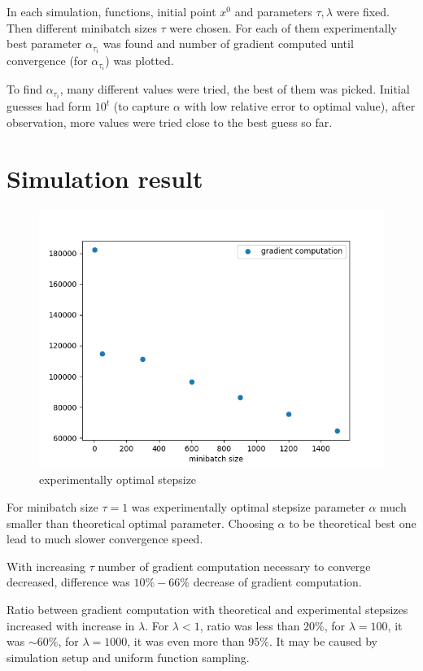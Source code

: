 \documentclass[11pt]{book}
\theoremstyle{definition}
\begin{document}
	
	In each simulation, functions, initial point $x^0$ and parameters $\tau, \lambda$ were fixed. Then different minibatch sizes $\tau$ were chosen. For each of them experimentally best parameter $\alpha_{\tau_i}$ was found and number of gradient computed until convergence (for $\alpha_{\tau_i}$) was plotted. 
	
	To find $\alpha_{\tau_i}$, many different values were tried, the best of them was picked. Initial guesses had form $10^t$ (to capture $\alpha$ with low relative error to optimal value), after observation, more values were tried close to the best guess so far.\\
	
	\section{Simulation result}
	
	\begin{figure}[H]
		\centering
		\includegraphics[width=.7\linewidth]{optimal_stepsize.png}
		\caption{experimentally optimal stepsize}
		\label{fig:optimal stepsize}
	\end{figure}
	
	
	
	For minibatch size $\tau=1$ was experimentally optimal stepsize parameter $\alpha$ much smaller than theoretical optimal parameter. Choosing $\alpha$ to be theoretical best one lead to much slower convergence speed.
	
	With increasing $\tau$ number of gradient computation necessary to converge decreased, difference was $10\% - 66\%$ decrease of gradient computation.
	
	Ratio between gradient computation with theoretical and experimental stepsizes increased with increase in $\lambda$. For $\lambda <1$, ratio was less than $20\%$, for $\lambda=100$, it was $\sim 60\%$, for $\lambda=1000$, it was even more than $95\%$. It may be caused by simulation setup and uniform function sampling.\\
	
\end{document}
